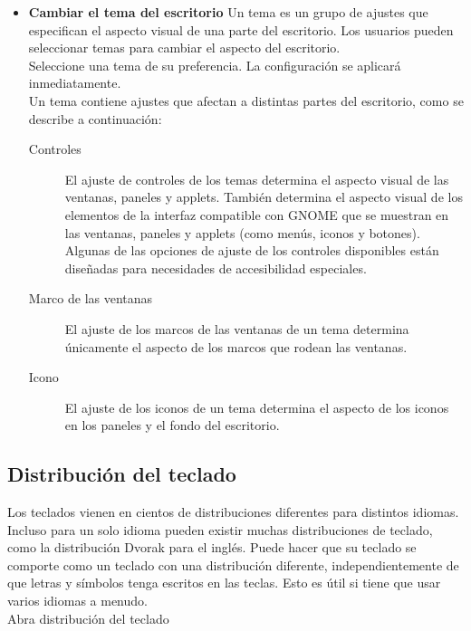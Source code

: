 \begin{itemize}
			\item {\large \bf Cambiar el tema del escritorio}
			Un tema es un grupo de ajustes que especifican el aspecto visual de una parte del escritorio. Los usuarios pueden seleccionar temas para cambiar el aspecto del escritorio.\\

Seleccione una tema de su preferencia. La configuración se aplicará inmediatamente.\\
Un tema contiene ajustes que afectan a distintas partes del escritorio, como se describe
a continuación:
\begin{description}
\item[Controles] El ajuste de controles de los temas determina el aspecto visual de las ventanas, paneles y applets. También determina el aspecto visual de los elementos de la interfaz compatible con GNOME que se muestran en las ventanas, paneles y applets (como menús, iconos y botones). Algunas de las opciones de ajuste de los controles disponibles están diseñadas para necesidades de accesibilidad especiales.
\item[Marco de las ventanas] El ajuste de los marcos de las ventanas de un tema determina únicamente el aspecto de los marcos que rodean las ventanas.
\item[Icono] El ajuste de los iconos de un tema determina el aspecto de los iconos en los paneles y el fondo del escritorio.
\end{description}
		\end{itemize}
	\subsection{Distribución del teclado}
	Los teclados vienen en cientos de distribuciones diferentes para distintos idiomas. Incluso para un solo idioma pueden existir muchas distribuciones de teclado, como la distribución Dvorak para el inglés. Puede hacer que su teclado se comporte como un teclado con una distribución diferente, independientemente de que letras y símbolos tenga escritos en las teclas. Esto es útil si tiene que usar varios idiomas a menudo.\\

Abra distribución del teclado\\

